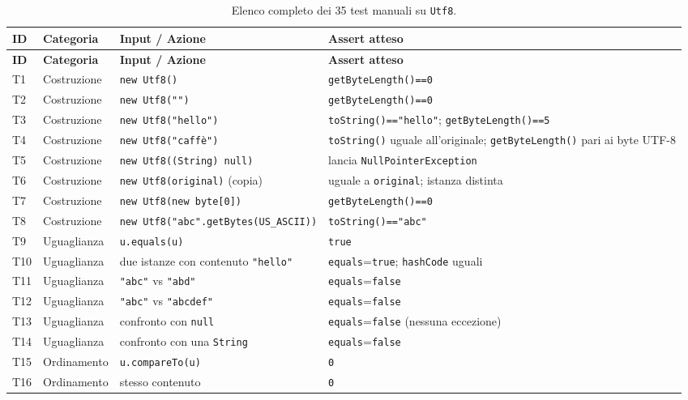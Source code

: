 \begin{longtable}{@{}p{0.7cm}p{2.3cm}p{6.1cm}p{6.1cm}@{}}
\caption{Elenco completo dei 35 test manuali su \texttt{Utf8}.}
\label{tab:utf8-elenco-test} \\
\toprule
\textbf{ID} & \textbf{Categoria} & \textbf{Input / Azione} & \textbf{Assert atteso} \\
\midrule
\endfirsthead
\toprule
\textbf{ID} & \textbf{Categoria} & \textbf{Input / Azione} & \textbf{Assert atteso} \\
\midrule
\endhead
T1 & Costruzione & \texttt{new Utf8()} & \texttt{getByteLength()==0} \\
T2 & Costruzione & \texttt{new Utf8("")} & \texttt{getByteLength()==0} \\
T3 & Costruzione & \texttt{new Utf8("hello")} & \texttt{toString()=="hello"}; \texttt{getByteLength()==5} \\
T4 & Costruzione & \texttt{new Utf8("caff\`e")} & \texttt{toString()} uguale all'originale; \texttt{getByteLength()} pari ai byte UTF-8 \\
T5 & Costruzione & \texttt{new Utf8((String) null)} & lancia \texttt{NullPointerException} \\
T6 & Costruzione & \texttt{new Utf8(original)} (copia) & uguale a \texttt{original}; istanza distinta \\
T7 & Costruzione & \texttt{new Utf8(new byte[0])} & \texttt{getByteLength()==0} \\
T8 & Costruzione & \texttt{new Utf8("abc".getBytes(US\_ASCII))} & \texttt{toString()=="abc"} \\
T9 & Uguaglianza & \texttt{u.equals(u)} & \texttt{true} \\
T10 & Uguaglianza & due istanze con contenuto \texttt{"hello"} & \texttt{equals}=\texttt{true}; \texttt{hashCode} uguali \\
T11 & Uguaglianza & \texttt{"abc"} vs \texttt{"abd"} & \texttt{equals}=\texttt{false} \\
T12 & Uguaglianza & \texttt{"abc"} vs \texttt{"abcdef"} & \texttt{equals}=\texttt{false} \\
T13 & Uguaglianza & confronto con \texttt{null} & \texttt{equals}=\texttt{false} (nessuna eccezione) \\
T14 & Uguaglianza & confronto con una \texttt{String} & \texttt{equals}=\texttt{false} \\
T15 & Ordinamento & \texttt{u.compareTo(u)} & \texttt{0} \\
T16 & Ordinamento & stesso contenuto & \texttt{0} \\

\end{longtable}
